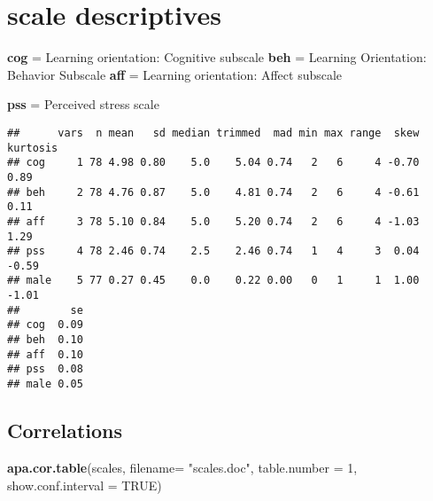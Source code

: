 \documentclass[]{article}
\newenvironment{Shaded}{\begin{snugshade}}{\end{snugshade}}
\newcommand{\KeywordTok}[1]{\textcolor[rgb]{0.13,0.29,0.53}{\textbf{#1}}}
\newcommand{\DataTypeTok}[1]{\textcolor[rgb]{0.13,0.29,0.53}{#1}}
\newcommand{\DecValTok}[1]{\textcolor[rgb]{0.00,0.00,0.81}{#1}}
\newcommand{\StringTok}[1]{\textcolor[rgb]{0.31,0.60,0.02}{#1}}
\newcommand{\OtherTok}[1]{\textcolor[rgb]{0.56,0.35,0.01}{#1}}
\newcommand{\OperatorTok}[1]{\textcolor[rgb]{0.81,0.36,0.00}{\textbf{#1}}}
\newcommand{\NormalTok}[1]{#1}
\begin{document}
\section{scale descriptives}\label{scale-descriptives}

\textbf{cog} = Learning orientation: Cognitive subscale \textbf{beh} =
Learning Orientation: Behavior Subscale \textbf{aff} = Learning
orientation: Affect subscale

\textbf{pss} = Perceived stress scale

\begin{Shaded}
\end{Shaded}

\begin{verbatim}
##      vars  n mean   sd median trimmed  mad min max range  skew kurtosis
## cog     1 78 4.98 0.80    5.0    5.04 0.74   2   6     4 -0.70     0.89
## beh     2 78 4.76 0.87    5.0    4.81 0.74   2   6     4 -0.61     0.11
## aff     3 78 5.10 0.84    5.0    5.20 0.74   2   6     4 -1.03     1.29
## pss     4 78 2.46 0.74    2.5    2.46 0.74   1   4     3  0.04    -0.59
## male    5 77 0.27 0.45    0.0    0.22 0.00   0   1     1  1.00    -1.01
##        se
## cog  0.09
## beh  0.10
## aff  0.10
## pss  0.08
## male 0.05
\end{verbatim}

\subsection{Correlations}\label{correlations}

\begin{Shaded}
\begin{Highlighting}[]
\KeywordTok{apa.cor.table}\NormalTok{(scales, }\DataTypeTok{filename=} \StringTok{"scales.doc"}\NormalTok{,}
              \DataTypeTok{table.number =} \DecValTok{1}\NormalTok{, }\DataTypeTok{show.conf.interval =} \OtherTok{TRUE}\NormalTok{)}
\end{Highlighting}
\end{Shaded}
\end{document}
